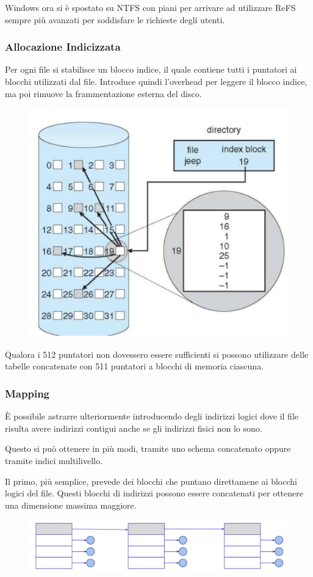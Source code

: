 Windows ora si è spostato su NTFS con piani per arrivare ad utilizzare ReFS  sempre più avanzati per soddisfare le richieste degli utenti.

\subsubsection{Allocazione Indicizzata}
Per ogni file si stabilisce un blocco indice, il quale contiene tutti i puntatori ai blocchi utilizzati dal file. Introduce quindi l'overhead per leggere il blocco indice, ma poi rimuove la frammentazione esterna del disco.

\begin{figure}[H]
    \centering
    \includegraphics[width=0.5\linewidth]{assets/allocazione-indicizzata.png}
\end{figure}

Qualora i 512 puntatori non dovessero essere sufficienti si possono utilizzare delle tabelle concatenate con 511 puntatori a blocchi di memoria ciascuna.

\subsubsection{Mapping}
È possibile astrarre ulteriormente introducendo degli indirizzi logici dove il file risulta avere indirizzi contigui anche se gli indirizzi fisici non lo sono.

\spacer
Questo si può ottenere in più modi, tramite uno schema concatenato oppure tramite indici multilivello.

\spacer
Il primo, più semplice, prevede dei blocchi che puntano direttamene ai blocchi logici del file. Questi blocchi di indirizzi possono essere concatenati per ottenere una dimensione massima maggiore.

\begin{figure}[H]
    \centering
    \includegraphics[width=0.5\linewidth]{assets/schema-concatenato.png}
\end{figure}

